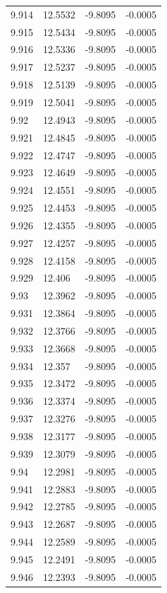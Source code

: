\begin{tabular}{llll}
9.914 & 12.5532 & -9.8095 & -0.0005 \\
9.915 & 12.5434 & -9.8095 & -0.0005 \\
9.916 & 12.5336 & -9.8095 & -0.0005 \\
9.917 & 12.5237 & -9.8095 & -0.0005 \\
9.918 & 12.5139 & -9.8095 & -0.0005 \\
9.919 & 12.5041 & -9.8095 & -0.0005 \\
9.92 & 12.4943 & -9.8095 & -0.0005 \\
9.921 & 12.4845 & -9.8095 & -0.0005 \\
9.922 & 12.4747 & -9.8095 & -0.0005 \\
9.923 & 12.4649 & -9.8095 & -0.0005 \\
9.924 & 12.4551 & -9.8095 & -0.0005 \\
9.925 & 12.4453 & -9.8095 & -0.0005 \\
9.926 & 12.4355 & -9.8095 & -0.0005 \\
9.927 & 12.4257 & -9.8095 & -0.0005 \\
9.928 & 12.4158 & -9.8095 & -0.0005 \\
9.929 & 12.406 & -9.8095 & -0.0005 \\
9.93 & 12.3962 & -9.8095 & -0.0005 \\
9.931 & 12.3864 & -9.8095 & -0.0005 \\
9.932 & 12.3766 & -9.8095 & -0.0005 \\
9.933 & 12.3668 & -9.8095 & -0.0005 \\
9.934 & 12.357 & -9.8095 & -0.0005 \\
9.935 & 12.3472 & -9.8095 & -0.0005 \\
9.936 & 12.3374 & -9.8095 & -0.0005 \\
9.937 & 12.3276 & -9.8095 & -0.0005 \\
9.938 & 12.3177 & -9.8095 & -0.0005 \\
9.939 & 12.3079 & -9.8095 & -0.0005 \\
9.94 & 12.2981 & -9.8095 & -0.0005 \\
9.941 & 12.2883 & -9.8095 & -0.0005 \\
9.942 & 12.2785 & -9.8095 & -0.0005 \\
9.943 & 12.2687 & -9.8095 & -0.0005 \\
9.944 & 12.2589 & -9.8095 & -0.0005 \\
9.945 & 12.2491 & -9.8095 & -0.0005 \\
9.946 & 12.2393 & -9.8095 & -0.0005 \\

\end{tabular}
